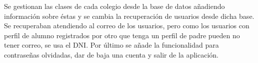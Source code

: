 	\bigskip
	Se gestionan las clases de cada colegio desde la base de datos añadiendo información sobre éstas y se cambia la recuperación de usuarios desde dicha base. Se recuperaban atendiendo al correo de los usuarios, pero como los usuarios con perfil de alumno registrados por otro que tenga un perfil de padre pueden no tener correo, se usa el DNI. Por último se añade la funcionalidad para contraseñas olvidadas, dar de baja una cuenta y salir de la aplicación.